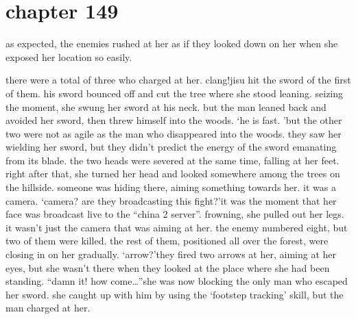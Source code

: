 \section{chapter 149}

                            as expected, the enemies rushed at her as if they looked down on her when she exposed her location so easily.





there were a total of three who charged at her.
clang!jisu hit the sword of the first of them.
 his sword bounced off and cut the tree where she stood leaning.
 seizing the moment, she swung her sword at his neck.
 but the man leaned back and avoided her sword, then threw himself into the woods.
‘he is fast.
’but the other two were not as agile as the man who disappeared into the woods.
they saw her wielding her sword, but they didn’t predict the energy of the sword emanating from its blade.
 the two heads were severed at the same time, falling at her feet.
right after that, she turned her head and looked somewhere among the trees on the hillside.
someone was hiding there, aiming something towards her.
 it was a camera.
‘camera? are they broadcasting this fight?’it was the moment that her face was broadcast live to the “china 2 server”.
frowning, she pulled out her legs.
 it wasn’t just the camera that was aiming at her.
the enemy numbered eight, but two of them were killed.
 the rest of them, positioned all over the forest, were closing in on her gradually.
‘arrow?’they fired two arrows at her, aiming at her eyes, but she wasn’t there when they looked at the place where she had been standing.
“damn it! how come…”she was now blocking the only man who escaped her sword.
 she caught up with him by using the ‘footstep tracking’ skill, but the man charged at her.

